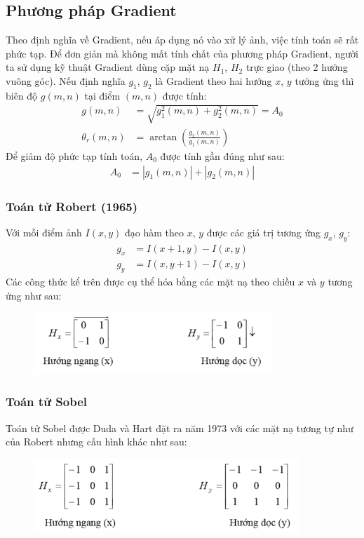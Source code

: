 \documentclass[../report.tex]{subfiles}
\begin{document}
\subsection{Phương pháp Gradient}
Theo định nghĩa về Gradient, nếu áp dụng nó vào xử lý ảnh, 
việc tính toán sẽ rất phức tạp. Để đơn giản mà không 
mất tính chất của phương pháp Gradient, người ta sử 
dụng kỹ thuật Gradient dùng cặp mặt nạ $H_1$, 
$H_2$ trực giao (theo 2 hướng vuông góc). Nếu định nghĩa 
$g_1$, $g_2$ là Gradient theo hai hướng $x$, $y$ tướng ứng thì 
biên độ $g(m,n)$ tại điểm $(m, n)$ được tính: 
\begin{align*}
g(m, n) &= \sqrt{g_1^2(m, n) + g_2^2(m, n)} = A_0 \\
\theta_r(m, n) &= \arctan \left(\frac{g_2(m, n)}{g_1(m, n)}\right)
\end{align*}
Để giảm độ phức tạp tính toán, $A_0$ được tính gần đúng như sau:
\begin{align*}
A_0 &= |g_1(m, n)| + |g_2(m, n)|
\end{align*}

\subsubsection{Toán tử Robert (1965)}
Với mỗi điểm ảnh $I(x,y)$ đạo hàm theo $x$, $y$ 
được các giá trị tương ứng $g_x$, $g_y$:
\begin{align*}
g_x &= I(x + 1, y) - I(x, y) \\
g_y &= I(x, y + 1) - I(x, y)
\end{align*}
Các công thức kể trên được cụ thể hóa bằng 
các mặt nạ theo chiều $x$ và $y$ tương ứng như sau:
\begin{figure}[H]
\centering
\includegraphics[width=9cm]{figures/sobert-operator.png}
\end{figure}
 
\subsubsection{Toán tử Sobel}
Toán tử Sobel được Duda và Hart đặt ra năm 
1973 với các mặt nạ tương tự như của 
Robert nhưng cấu hình khác như sau:
\begin{figure}[H]
\centering
\includegraphics[width=10cm]{figures/sobel-operator.png}
\end{figure}
\end{document}

